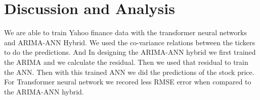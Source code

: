 \chapter{Discussion and Analysis}
\label{ch:evaluation}

We are able to train Yahoo finance data with the transformer neural networks and ARIMA-ANN Hybrid. We used the co-variance relations between the tickers to do the predictions. And In designing the ARIMA-ANN hybrid we first trained the ARIMA and we calculate the residual. Then we used that residual to train the ANN. Then with this trained  ANN we did the predictions of the stock price. For Transformer neural network we recored less RMSE error when compared to the ARIMA-ANN hybrid.
